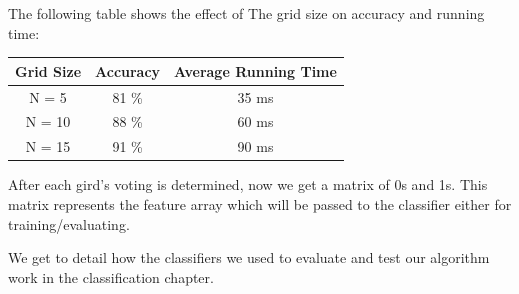 The following table shows the effect of The grid size on accuracy and running time:
\bigskip
\begin{center}
\begin{tabular}{ |c|c|c| }
 \hline
 Grid Size & Accuracy & Average Running Time \\
 \hline
 N = 5 & 81 \%  & 35 ms \\
 \hline
 N = 10 & 88 \%  & 60 ms\\
 \hline
 N = 15 & 91 \%  & 90 ms\\
 \hline
\end{tabular}
\end{center}

After each gird's voting is determined, now we get a matrix of 0s and 1s. This matrix represents the feature array which will be passed to the classifier either for training/evaluating.

We get to detail how the classifiers we used to evaluate and test our algorithm work in the classification chapter.


